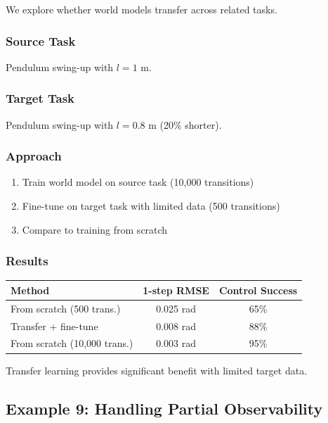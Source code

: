 We explore whether world models transfer across related tasks.

\subsubsection{Source Task}

Pendulum swing-up with $l = 1$ m.

\subsubsection{Target Task}

Pendulum swing-up with $l = 0.8$ m (20\% shorter).

\subsubsection{Approach}

\begin{enumerate}
    \item Train world model on source task (10,000 transitions)
    \item Fine-tune on target task with limited data (500 transitions)
    \item Compare to training from scratch
\end{enumerate}

\subsubsection{Results}

\begin{center}
\begin{tabular}{lcc}
\toprule
\textbf{Method} & \textbf{1-step RMSE} & \textbf{Control Success} \\
\midrule
From scratch (500 trans.) & 0.025 rad & 65\% \\
Transfer + fine-tune & 0.008 rad & 88\% \\
From scratch (10,000 trans.) & 0.003 rad & 95\% \\
\bottomrule
\end{tabular}
\end{center}

Transfer learning provides significant benefit with limited target data.

\subsection{Example 9: Handling Partial Observability}

